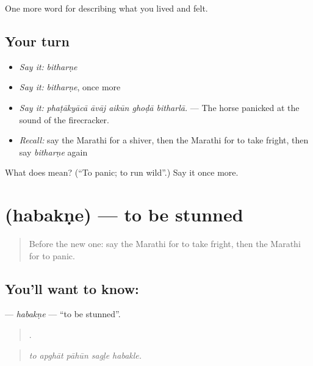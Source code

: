 \begin{grammarlens}[title={What you've built}]
One more word for describing what you lived and felt.
\end{grammarlens}

\subsection*{Your turn}
\begin{itemize}
\raggedright
  \item \emph{Say it:} \emph{bitharṇe}
  \item \emph{Say it:} \emph{bitharṇe}, once more
  \item \emph{Say it:} \emph{phaṭākyācā āvāj aikūn ghoḍā bitharlā.} — The horse panicked at the sound of the firecracker.
  \item \emph{Recall:} say the Marathi for a shiver, then the Marathi for to take fright, then say \emph{bitharṇe} again
\end{itemize}

\begin{tcolorbox}[breakable,colback=teal!4,colframe=teal!35!black,title={Before you move on}]
What does  mean? (\textquotedblleft{}To panic; to run wild\textquotedblright{}.) Say it once more.
\end{tcolorbox}
\section[\texorpdfstring{\mr{हबकणे} (habakṇe)}{हबकणे (habakṇe)}]{ (habakṇe) — to be stunned}

\label{lesson:MR-C452-habakne}



\begin{quote}
Before the new one: say the Marathi for to take fright, then the Marathi for to panic.
\end{quote}

\subsection*{You'll want to know: }
\textbf{} — \emph{habakṇe} — \textquotedblleft{}to be stunned\textquotedblright{}.

\begin{quote}
    .
\end{quote}

\begin{quote}
\emph{to apghāt pāhūn sagḷe habakle.}
\end{quote}

